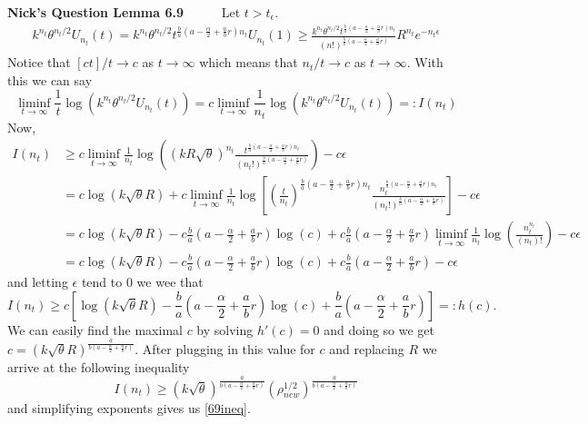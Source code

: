 \documentclass[a4paper,11pt]{article}
\numberwithin{equation}{section}
\theoremstyle{plain}
\theoremstyle{definition}
\newcounter{NQ}
\newenvironment{NickQuestion}[1][] %
{\refstepcounter{NQ}
	\begin{mdframed}[backgroundcolor=lightgray]\textbf{Nick's Question \theNQ \: #1~~}~~~\noindent}%
	{\end{mdframed}}
\numberwithin{NQ}{section}
\numberwithin{LQ}{section}
\numberwithin{ZQ}{section}
\begin{document}
\begin{NickQuestion}[Lemma 6.9]
		Let $t > t_\epsilon$.
		\begin{align*}
		k^{n_t}\theta^{n_t/2}U_{n_t}(t) = 	k^{n_t} \theta^{n_t/2} t^{\frac{b}{a} \left( a-\frac{\alpha}{2} + \frac{a}{b}r \right)n_t } U_{n_t}(1) \ge \frac{ k^{n_t} \theta^{n_t/2} t^{\frac{b}{a} \left( a-\frac{\alpha}{2} + \frac{a}{b}r \right)n_t } }{ (n!)^{\frac{b}{a} \left(a-\frac{\alpha}{2} +\frac{a}{b}r \right)} } R^{n_t}e^{-n_t \epsilon}
		\end{align*}
		Notice that $[ct]/t \to c$ as $t \to \infty$ which means that $n_t/t \to c$ as $t \to \infty$. With this we can say
		\[
		\liminf_{t \to \infty} \frac{1}{t} \log \left( k^{n_t} \theta^{n_t/2} U_{n_t}(t) \right) = c \liminf_{t\to \infty} \frac{1}{n_t} \log \left( k^{n_t} \theta^{n_t/2} U_{n_t}(t) \right)  =: I(n_t)
		\]
		Now,
		\begin{align*}
		I(n_t) & \ge  c \liminf_{t\to \infty} \frac{1}{n_t} \log \left( (kR\sqrt{\theta})^{n_t} \frac{ t^{\frac{b}{a} \left( a-\frac{\alpha}{2} + \frac{a}{b}r \right)n_t } }{ (n_t!)^{\frac{b}{a}\left( a -\frac{\alpha}{2} + \frac{a}{b}r \right) }  }\right) - c\epsilon
		\\&= c \log(k \sqrt{\theta}R) + c \liminf_{t \to \infty} \frac{1}{n_t} \log \left[  \left(\frac{t}{n_t}\right)^{\frac{b}{a}\left(a-\frac{\alpha}{2} + \frac{a}{b}r\right)n_t} \frac{ n_t^{\frac{b}{a}\left( a- \frac{\alpha}{2} + \frac{a}{b}r \right)n_t } } { (n_t!)^{\frac{b}{a}\left( a - \frac{\alpha}{2} + \frac{a}{b}r \right) } }\right] - c \epsilon
		\\&=  c \log(k \sqrt{\theta}R) - c\frac{b}{a}\left( a - \frac{\alpha}{2} + \frac{a}{b}r \right) \log(c) + c\frac{b}{a}\left( a - \frac{\alpha}{2} + \frac{a}{b}r \right) \liminf_{t \to \infty} \frac{1}{n_t}\log\left(\frac{n_t^{n_t}}{(n_t)!}\right) - c\epsilon
		\\& =   c \log(k \sqrt{\theta}R) - c\frac{b}{a}\left( a - \frac{\alpha}{2} + \frac{a}{b}r \right) \log(c) + c\frac{b}{a}\left( a - \frac{\alpha}{2} + \frac{a}{b}r \right)  - c\epsilon
		\end{align*}
		and letting $\epsilon$ tend to $0$ we wee that
		\[
		I(n_t) \ge c \left[ \log(k \sqrt{\theta}R) - \frac{b}{a}\left( a - \frac{\alpha}{2} + \frac{a}{b}r \right) \log(c) + \frac{b}{a}\left( a - \frac{\alpha}{2} + \frac{a}{b}r \right) \right] =: h(c).
		\]
		We can easily find the maximal $c$ by solving $h'(c)=0$ and doing so we get $c=(k \sqrt{\theta}R)^{\frac{a}{b\left( a - \frac{\alpha}{2} + \frac{a}{b}r \right)}}$. After plugging in this value for $c$ and replacing $R$ we arrive at the following inequality
		\[
		I(n_t) \ge (k\sqrt{\theta})^{\frac{a}{b\left( a - \frac{\alpha}{2} + \frac{a}{b}r \right)} }(\rho_{new}^{1/2})^{\frac{a}{b\left( a - \frac{\alpha}{2} + \frac{a}{b}r \right)}}
		\]
		and simplifying exponents gives us \ref{69ineq}.
	\end{NickQuestion}
\end{document}
